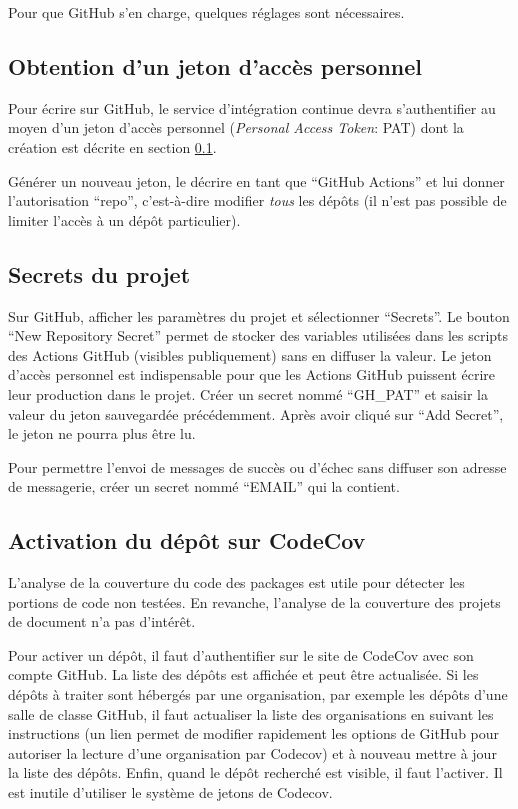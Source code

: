 \documentclass[
  12pt,
  french,
  a4paper,
  extrafontsizes,onecolumn,openright
  ]{memoir}
\begin{document}
Pour que GitHub s'en charge, quelques réglages sont nécessaires.

\hypertarget{sec:pat}{%
\subsection{Obtention d'un jeton d'accès personnel}\label{sec:pat}}

Pour écrire sur GitHub, le service d'intégration continue devra s'authentifier au moyen d'un jeton d'accès personnel (\emph{Personal Access Token}: PAT) dont la création est décrite en section \ref{sec:pat}.

Générer un nouveau jeton, le décrire en tant que \enquote{GitHub Actions} et lui donner l'autorisation \enquote{repo}, c'est-à-dire modifier \emph{tous} les dépôts (il n'est pas possible de limiter l'accès à un dépôt particulier).

\hypertarget{sec:secrets-ci}{%
\subsection{Secrets du projet}\label{sec:secrets-ci}}

Sur GitHub, afficher les paramètres du projet et sélectionner \enquote{Secrets}.
Le bouton \enquote{New Repository Secret} permet de stocker des variables utilisées dans les scripts des Actions GitHub (visibles publiquement) sans en diffuser la valeur.
Le jeton d'accès personnel est indispensable pour que les Actions GitHub puissent écrire leur production dans le projet.
Créer un secret nommé \enquote{GH\_PAT} et saisir la valeur du jeton sauvegardée précédemment.
Après avoir cliqué sur \enquote{Add Secret}, le jeton ne pourra plus être lu.

Pour permettre l'envoi de messages de succès ou d'échec sans diffuser son adresse de messagerie, créer un secret nommé \enquote{EMAIL} qui la contient.

\hypertarget{activation-du-duxe9puxf4t-sur-codecov}{%
\subsection{Activation du dépôt sur CodeCov}\label{activation-du-duxe9puxf4t-sur-codecov}}

L'analyse de la couverture du code des packages est utile pour détecter les portions de code non testées.
En revanche, l'analyse de la couverture des projets de document n'a pas d'intérêt.

Pour activer un dépôt, il faut d'authentifier sur le site de CodeCov avec son compte GitHub.
La liste des dépôts est affichée et peut être actualisée.
Si les dépôts à traiter sont hébergés par une organisation, par exemple les dépôts d'une salle de classe GitHub, il faut actualiser la liste des organisations en suivant les instructions (un lien permet de modifier rapidement les options de GitHub pour autoriser la lecture d'une organisation par Codecov) et à nouveau mettre à jour la liste des dépôts.
Enfin, quand le dépôt recherché est visible, il faut l'activer.
Il est inutile d'utiliser le système de jetons de Codecov.
\end{document}
